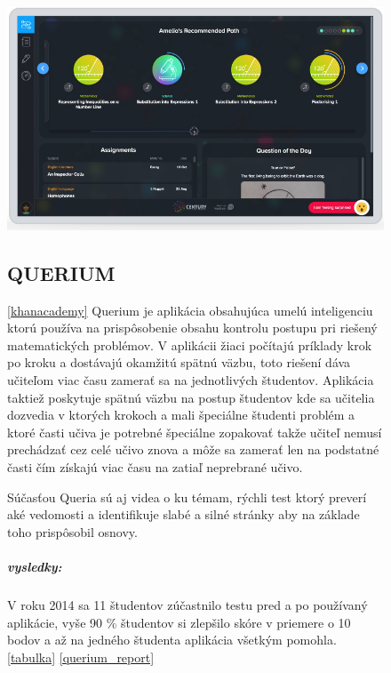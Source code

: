 \documentclass[10pt,oneside,slovak,a4paper]{article}
\begin{document}
\begin{figure}[h!]
	\includegraphics[width=0.7\linewidth]{obrazky/artificial-intelligence-applications-edtech-century-tech}
	\caption{}
	\label{fig:artificial-intelligence-applications-edtech-century-tech}


\subsection{QUERIUM}
\ref{khanacademy}
Querium je aplikácia obsahujúca umelú inteligenciu ktorú používa na prispôsobenie obsahu kontrolu postupu pri riešený matematických problémov. V aplikácii žiaci počítajú príklady krok po kroku a dostávajú okamžitú spätnú väzbu, toto riešení dáva učiteľom viac času zamerať sa na jednotlivých študentov. Aplikácia taktiež poskytuje spätnú väzbu na postup študentov kde sa učitelia dozvedia v ktorých krokoch a mali špeciálne študenti problém a ktoré časti učiva je potrebné špeciálne zopakovať takže učiteľ nemusí prechádzať cez celé učivo znova a môže sa zamerať len na podstatné časti čím získajú viac času na zatiaľ neprebrané učivo.

Súčasťou Queria sú aj videa o ku témam, rýchli test ktorý preverí aké vedomosti a identifikuje slabé a silné stránky aby na základe toho prispôsobil osnovy. 




\subparagraph{vysledky:}
V roku 2014 sa 11 študentov zúčastnilo testu pred a po používaný aplikácie, vyše 90 \% študentov si zlepšilo skóre v priemere o 10 bodov a až na jedného študenta aplikácia všetkým pomohla. \ref{tabulka} \ref{querium_report} 

\end{figure}
\end{document}
